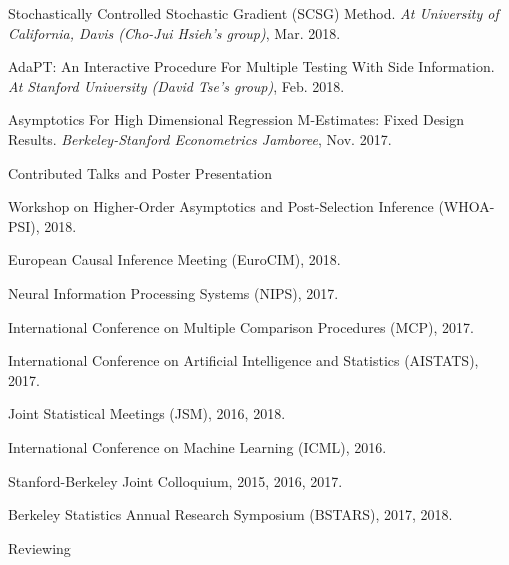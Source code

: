 \documentclass{article}
\begin{document}
\vspace{2mm}
Stochastically Controlled Stochastic Gradient (SCSG) Method. \emph{At University of California, Davis (Cho-Jui Hsieh's group)}, Mar. 2018.

\vspace{2mm}
AdaPT: An Interactive Procedure For Multiple Testing With Side Information. \emph{At Stanford University (David Tse's group)}, Feb. 2018.

\vspace{2mm}
Asymptotics For High Dimensional Regression M-Estimates: Fixed Design Results. \emph{Berkeley-Stanford Econometrics Jamboree}, Nov. 2017. 

\vspace{5mm}

\begin{large}
\noindent Contributed Talks and Poster Presentation
\end{large}

\vspace{2mm}
Workshop on Higher-Order Asymptotics and Post-Selection Inference (WHOA-PSI), 2018.

\vspace{2mm}
European Causal Inference Meeting (EuroCIM), 2018.

\vspace{2mm}
Neural Information Processing Systems (NIPS), 2017.

\vspace{2mm}
International Conference on Multiple Comparison Procedures (MCP), 2017.

\vspace{2mm}
International Conference on Artificial Intelligence and Statistics (AISTATS), 2017.

\vspace{2mm}
Joint Statistical Meetings (JSM), 2016, 2018.

\vspace{2mm}
International Conference on Machine Learning (ICML), 2016.

\vspace{2mm}
Stanford-Berkeley Joint Colloquium, 2015, 2016, 2017.

\vspace{2mm}
Berkeley Statistics Annual Research Symposium (BSTARS), 2017, 2018.

\vspace{5mm}
\begin{large}
\noindent Reviewing
\end{large}
\end{document}
